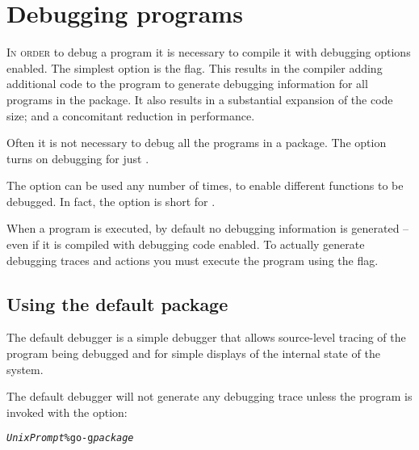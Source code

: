 \chapter{Debugging \go programs}
\label{debugging}
\lettrine[nindent=0.1em]{I}{n order} to debug a \go program it is necessary to
compile it with debugging options enabled. The simplest option is the 
flag. This results in the compiler adding additional code to the program to
generate debugging information for all programs in the package. It also results
in a substantial expansion of the code size; and a concomitant reduction in
performance.

Often it is not necessary to debug all the programs in a package. The  option turns on debugging for just .

The  option can be used any number of times, to enable different functions to be debugged. In fact, the  option is short for .

When a program is executed, by default no debugging information is generated -- even if it is compiled with debugging code enabled. To actually generate debugging traces and actions you must execute the \go program using the  flag.


\section{Using the default  package}
\label{debug:default}

The default debugger is a simple debugger that allows source-level tracing of the program being debugged and for simple displays of the internal state of the system. 

The default debugger will not generate any debugging trace unless the \go program is invoked with the  option:
\begin{alltt}
\emph{UnixPrompt}\% go -g \emph{package}
\end{alltt}

